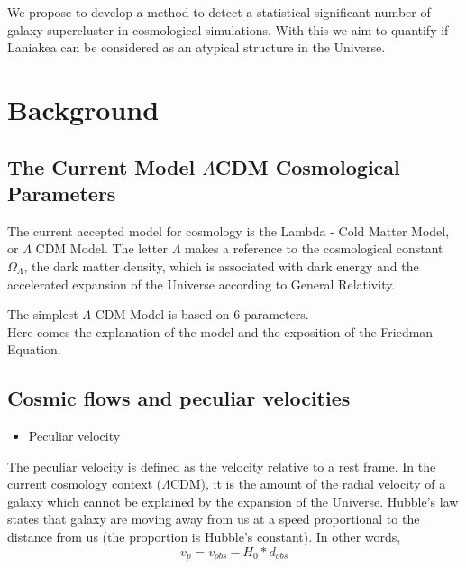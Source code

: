 \documentclass[12pt]{article}
\begin{document}
We propose to develop a method to detect a
 statistical significant number of galaxy
supercluster in cosmological simulations. 
With this we aim to quantify if Laniakea can be
 considered as an atypical structure in
the Universe. 
\\

\section{Background}
\subsection{The Current Model $\Lambda$CDM Cosmological Parameters}
\label{cosmo_constants}

\begin{par}
The current accepted model for cosmology is the Lambda
 - Cold Matter Model, or $\Lambda$ CDM Model. The
  letter $\Lambda$ makes a reference to the
   cosmological constant $\Omega_{\Lambda}$, the dark
    matter density, which is
    associated with dark energy and the accelerated
     expansion of the Universe according to General
      Relativity.
\end{par}

\begin{par}
The simplest $\Lambda$-CDM Model is based on 6 parameters.\\

Here comes the explanation of the model and the exposition of the Friedman Equation.\\

\end{par}




\subsection{Cosmic flows and peculiar velocities}

\begin{itemize}
\item Peculiar velocity
\end{itemize}
\begin{par}
The peculiar velocity is defined as the velocity relative to a rest frame. In the current cosmology context ($\Lambda$CDM), it is the amount of the radial velocity of a galaxy which cannot be explained by the expansion of the Universe. Hubble's law states that galaxy are moving away from us at a speed proportional to the distance from us (the proportion is Hubble's constant). In other words,
\[ 
v_p = v_{obs} - H_{0} * d_{obs}
\]
\end{par}
\end{document}
